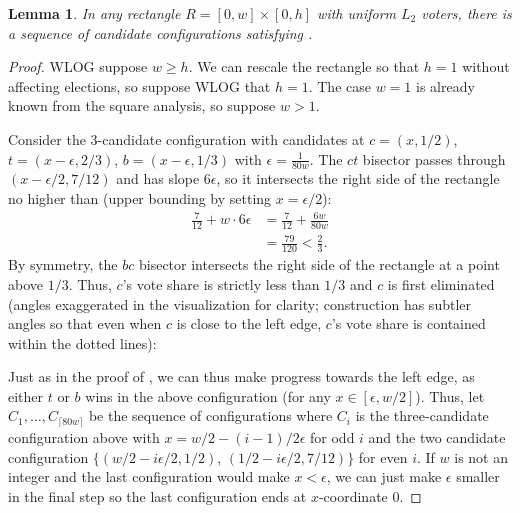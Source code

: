 \documentclass{article}
\theoremstyle{theorem}
\newtheorem{lemma}{Lemma}
\theoremstyle{definition}
\begin{document}
\begin{lemma}\label{lemma:rect-minimal-l2}
  In any rectangle $R = [0, w] \times [0, h]$ with uniform $L_2$ voters, there is a sequence of candidate configurations satisfying .
\end{lemma}
\begin{proof}
WLOG suppose $w \ge h$. We can rescale the rectangle so that $h = 1$ without affecting elections, so suppose WLOG that $h = 1$. The case $w = 1$ is already known from the square analysis, so suppose $w > 1$. 

Consider the 3-candidate configuration with candidates at $c = (x, 1/2)$, $t = (x - \epsilon, 2/3)$, $b = (x - \epsilon, 1/3)$ with $\epsilon = \frac{1}{80 w}$. The $ct$ bisector passes through $(x - \epsilon / 2, 7/12)$ and has slope $6\epsilon$, so it intersects the right side of the rectangle no higher than (upper bounding by setting $x = \epsilon / 2$):
\begin{align*}
  \frac{7}{12} + w\cdot  6\epsilon &= \frac{7}{12} + \frac{6w}{80w}\\
   &= \frac{79}{120} < \frac 2 3.
\end{align*}
By symmetry, the $bc$ bisector intersects the right side of the rectangle at a point above $1/3$. Thus, $c$'s vote share is strictly less than $1/3$ and $c$ is first eliminated (angles exaggerated in the visualization for clarity; construction has subtler angles so that even when $c$ is close to the left edge, $c$'s vote share is contained within the dotted lines):


 \begin{center}
  \end{center}
Just as in the proof of , we can thus make progress towards the left edge, as either $t$ or $b$ wins in the above configuration (for any $x \in [\epsilon, w/2]$). Thus, let $C_1, \dots, C_{\lceil80w \rceil}$ be the sequence of configurations where $C_i$ is the three-candidate configuration above with $x = w/2 - (i-1)/2 \epsilon$ for odd $i$ and the two candidate configuration $\{(w/2 - i \epsilon / 2, 1/2)$, $(1/2 - i \epsilon/2, 7/12)\}$ for even $i$. If $w$ is not an integer and the last configuration would make $x < \epsilon$, we can just make $\epsilon$ smaller in the final step so the last configuration ends at $x$-coordinate $0$.   


\end{proof}
\end{document}

